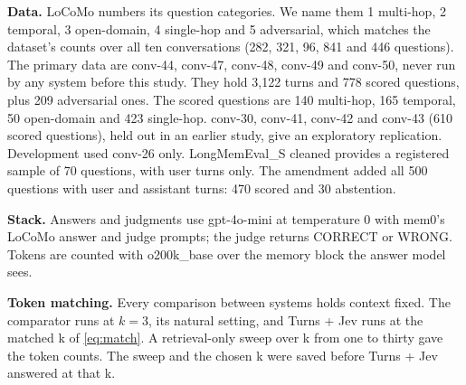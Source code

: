\documentclass[11pt]{article}
\newcommand{\src}[1]{}
\begin{document}
\textbf{Data.} LoCoMo \citep{maharana2024locomo} numbers its question categories. We name them 1 multi-hop, 2 temporal, 3 open-domain, 4 single-hop and 5 adversarial, which matches the dataset's counts over all ten conversations (282\src{bench/data/locomo10.json (count of category 1, all ten conversations)}, 321\src{bench/data/locomo10.json (count of category 2, all ten conversations)}, 96\src{bench/data/locomo10.json (count of category 3, all ten conversations)}, 841\src{bench/data/locomo10.json (count of category 4, all ten conversations)} and 446\src{bench/data/locomo10.json (count of category 5, all ten conversations)} questions). The primary data are conv-44, conv-47, conv-48, conv-49 and conv-50, never run by any system before this study. They hold 3,122\src{bench/results/v3/batch\_b\_report.json\#write/engram v2/turns} turns and 778\src{bench/results/v3/batch\_b\_report.json\#H1/questions} scored questions, plus 209\src{bench/results/v3/batch\_b\_report.json\#fresh\_adversarial/mem0 k3/questions} adversarial ones. The scored questions are 140\src{bench/results/v3/lean\_t0r\_\_heldout\_*\_\_k3.json (count of category 1)} multi-hop, 165\src{bench/results/v3/lean\_t0r\_\_heldout\_*\_\_k3.json (count of category 2)} temporal, 50\src{bench/results/v3/lean\_t0r\_\_heldout\_*\_\_k3.json (count of category 3)} open-domain and 423\src{bench/results/v3/lean\_t0r\_\_heldout\_*\_\_k3.json (count of category 4)} single-hop. conv-30, conv-41, conv-42 and conv-43 (610\src{bench/results/v3/batch\_a\_report.json\#exploratory/L0 k3/questions} scored questions), held out in an earlier study, give an exploratory replication. Development used conv-26 only. LongMemEval\_S cleaned \citep{wu2025longmemeval} provides a registered sample of 70\src{bench/results/v3/batch\_c\_report.json\#S6/questions} questions, with user turns only. The amendment added all 500\src{bench/results/v3/batch\_c\_report.json (470 scored + 30 abstention)} questions with user and assistant turns: 470\src{bench/results/v3/batch\_c\_report.json\#S7/questions} scored and 30\src{bench/results/v3/batch\_c\_report.json\#expansion/T0R 3 (abstention, correct = abstained)/questions} abstention.

\textbf{Stack.} Answers and judgments use gpt-4o-mini at temperature 0 with mem0's LoCoMo answer and judge prompts; the judge returns CORRECT or WRONG. Tokens are counted with o200k\_base over the memory block the answer model sees.

\textbf{Token matching.} Every comparison between systems holds context fixed. The comparator runs at $k{=}$3, its natural setting, and Turns + Jev runs at the matched k of \cref{eq:match}. A retrieval-only sweep over k from one to thirty gave the token counts. The sweep and the chosen k were saved before Turns + Jev answered at that k.
\end{document}
